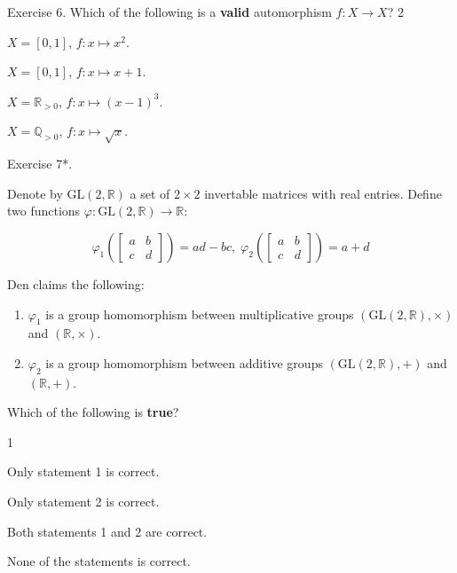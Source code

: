 \documentclass[../lecture-notes-148x210.tex]{subfiles}
\begin{document}
\begin{xexercise}
    {Exercise 6.}
    {Which of the following is a \textbf{valid} automorphism $f: X \to X$?}
    {2}
    {
        \item $X = [0,1]$, $f: x \mapsto x^2$.
        \item $X = [0,1]$, $f: x \mapsto x + 1$.
        \item $X = \mathbb{R}_{>0}$, $f: x \mapsto (x-1)^3$.
        \item $X = \mathbb{Q}_{>0}$, $f: x \mapsto \sqrt{x}$.
    }
\end{xexercise}

\begin{xexercise}
    {Exercise 7*.}
    {
        Denote by $\text{GL}(2,\mathbb{R})$ a set of $2\times 2$ invertable matrices with real entries. Define 
        two functions $\varphi: \text{GL}(2,\mathbb{R}) \to \mathbb{R}$:
        
        \begin{equation*}
            \varphi_1 \left(\begin{bmatrix}
                a & b \\ c & d
            \end{bmatrix}\right) = ad - bc, \; \varphi_2 \left(\begin{bmatrix}
                a & b \\ c & d
            \end{bmatrix}\right) = a + d
        \end{equation*}
        
        Den claims the following:
        \begin{enumerate}
            \item $\varphi_1$ is a group homomorphism between multiplicative groups $(\text{GL}(2,\mathbb{R}), \times)$ and $(\mathbb{R}, \times)$.
            \item $\varphi_2$ is a group homomorphism between additive groups $(\text{GL}(2, \mathbb{R}), +)$ and $(\mathbb{R}, +)$.
        \end{enumerate}
        
        Which of the following is \textbf{true}?
    }
    {1}
    {
        \item Only statement 1 is correct.
        \item Only statement 2 is correct.
        \item Both statements 1 and 2 are correct.
        \item None of the statements is correct.
    }
\end{xexercise}
\end{document}
